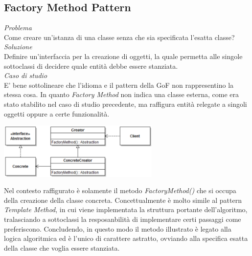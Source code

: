 \documentclass{article}
\begin{document}
\subsection*{Factory Method Pattern}
\large
\textit{Problema}\\
Come creare un'istanza di una classe senza che sia specificata l'esatta classe?\vspace*{14pt}\\
\textit{Soluzione}\\
Definire un'interfaccia per la creazione di oggetti, la quale permetta alle singole sottoclassi di decidere quale entità debbe essere stanziata.\vspace*{14pt}\\
\textit{Caso di studio}\\
E' bene sottolineare che l'idioma e il pattern della GoF non rappresentino la stessa cosa. In quanto \textit{Factory Method} non indica una classe esterna, come era stato stabilito nel caso di studio precedente, ma raffigura entità relegate a singoli oggetti oppure a certe funzionalità.\vspace*{7pt}
\begin{center}
    \includegraphics[width=0.6\textwidth]{foto 2.png}
\end{center}
Nel contesto raffigurato è solamente il metodo \textit{FactoryMethod()} che si occupa della creazione della classe concreta. Concettualmente è molto simile al pattern \textit{Template Method}, in cui viene implementata la struttura portante dell'algoritmo, tralasciando a sottoclassi la resposanbilità di implementare certi passaggi come preferiscono. Concludendo, in questo modo il metodo illustrato è legato alla logica algoritmica ed è l'unico di carattere astratto, ovviando alla specifica esatta della classe che voglia essere stanziata.  
\end{document}
